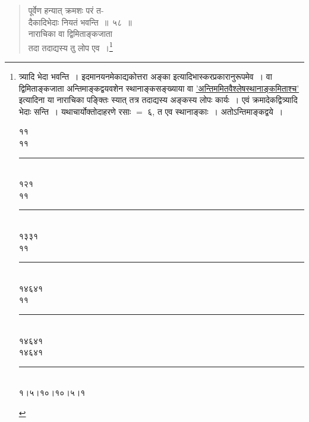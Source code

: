 \documentclass[11pt, openany]{book}
\begin{document}
\begin{quote}
{\gk पूर्वेण हन्यात् क्रमशः परं त-\\
दैकादिभेदाः नियतं भवन्ति~॥~५८~॥\\
नाराचिका वा द्विमिताङ्कजाता\\
तदा तदाद्यस्य तु लोप एव~।}\renewcommand{\thefootnote}{}\footnote{\hspace{-8mm} त्र्यादि भेदा भवन्ति~। इदमानयनमेकाद्यकोत्तरा अङ्का इत्यादिभास्करप्रकारानुरूपमेव~। वा द्विमिताङ्कजाता अन्तिमाङ्कद्वयवशेन स्थानाङ्कसङ्ख्याया वा \hyperref[13.21]{'अन्तिममितवैश्लेषस्थानाङ्कमिताश्च'} इत्यादिना या नाराचिका पङ्क्तिः स्यात् तत्र तदाद्यस्य अङ्कस्य लोपः कार्यः~। एवं क्रमादेकद्वित्र्यादि भेदाः सन्ति~। यथाचार्योक्तोदाहरणे रसाः $=$ ६, त एव स्थानाङ्काः~। अतोऽन्तिमाङ्कद्वये~।\\

\begin{minipage}{.2\textwidth} 
\begin{flushright}

११\\
११\\
\vspace{-2mm}

\rule{5mm}{.1mm}\\
१२१\\
११\\
\vspace{-2mm}

\rule{6mm}{.1mm}\\
१३३१\\
११\\
\vspace{-2mm}

\rule{9mm}{.1mm}\\
१४६४१\\
११\\
\vspace{-2mm}

\rule{9mm}{.1mm}\\
१४६४१\\
१४६४१\\
\vspace{-2mm}

\rule{22mm}{.1mm}\\
१।५।१०।१०।५।१ 

\end{flushright} 
\end{minipage} 
\begin{minipage}{.05\textwidth} 
\vspace{52mm}


\end{minipage}}
\end{quote}
\end{document}
